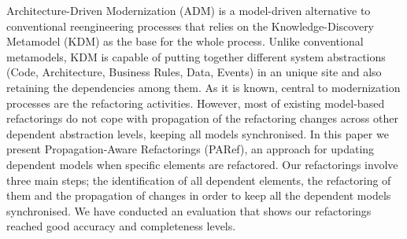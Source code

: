 %
Architecture-Driven Modernization (ADM) is a model-driven alternative to conventional reengineering processes that relies on the Knowledge-Discovery Metamodel (KDM) as the base for the whole process. Unlike conventional metamodels, KDM is capable of putting together different system abstractions (Code, Architecture, Business Rules, Data, Events) in an unique site and also retaining the dependencies among them. As it is known, central to modernization processes are the refactoring activities. However, most of existing model-based refactorings do not cope with propagation of the refactoring changes across other dependent abstraction levels, keeping all models synchronised. In this paper we present Propagation-Aware Refactorings (PARef), an approach for updating dependent models when specific elements are refactored. Our refactorings involve three main steps; the identification of all dependent elements, the refactoring of them and the propagation of changes in order to keep all the dependent models synchronised. We have conducted an evaluation that shows our refactorings reached good accuracy and completeness levels.
%
%
%




